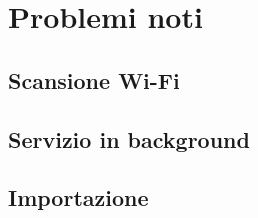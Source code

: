 \documentclass[11pt]{article}
\begin{document}









\section{Problemi noti}

\subsection{Scansione Wi-Fi}

\subsection{Servizio in background}

\subsection{Importazione}
\end{document}
